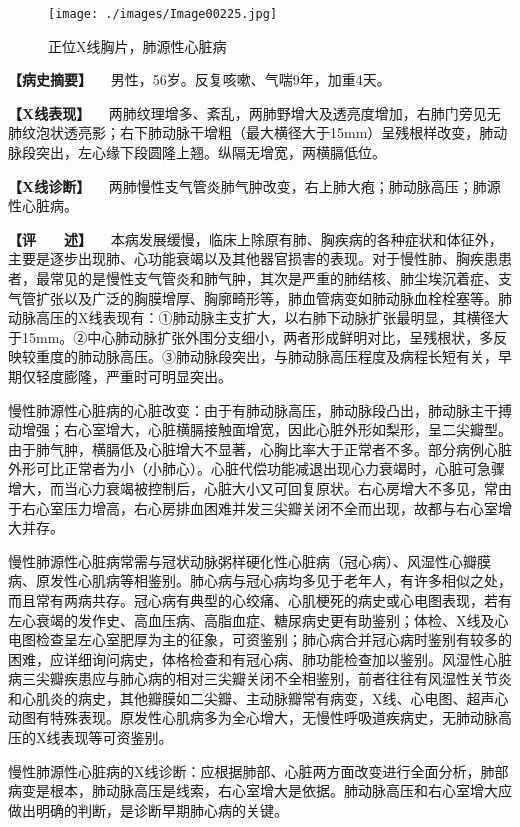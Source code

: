 \begin{figure}[!htbp]
 \centering
 \texttt{[image: ./images/Image00225.jpg]}
 \captionsetup{justification=centering}
 \caption{正位X线胸片，肺源性心脏病}
 \label{fig4-5-1}
  \end{figure} 

\textbf{【病史摘要】} 　男性，56岁。反复咳嗽、气喘9年，加重4天。

\textbf{【X线表现】}
　两肺纹理增多、紊乱，两肺野增大及透亮度增加，右肺门旁见无肺纹泡状透亮影；右下肺动脉干增粗（最大横径大于15mm）呈残根样改变，肺动脉段突出，左心缘下段圆隆上翘。纵隔无增宽，两横膈低位。

\textbf{【X线诊断】}
　两肺慢性支气管炎肺气肿改变，右上肺大疱；肺动脉高压；肺源性心脏病。

\textbf{【评　　述】}
　本病发展缓慢，临床上除原有肺、胸疾病的各种症状和体征外，主要是逐步出现肺、心功能衰竭以及其他器官损害的表现。对于慢性肺、胸疾患患者，最常见的是慢性支气管炎和肺气肿，其次是严重的肺结核、肺尘埃沉着症、支气管扩张以及广泛的胸膜增厚、胸廓畸形等，肺血管病变如肺动脉血栓栓塞等。肺动脉高压的X线表现有：①肺动脉主支扩大，以右肺下动脉扩张最明显，其横径大于15mm。②中心肺动脉扩张外围分支细小，两者形成鲜明对比，呈残根状，多反映较重度的肺动脉高压。③肺动脉段突出，与肺动脉高压程度及病程长短有关，早期仅轻度膨隆，严重时可明显突出。

慢性肺源性心脏病的心脏改变：由于有肺动脉高压，肺动脉段凸出，肺动脉主干搏动增强；右心室增大，心脏横膈接触面增宽，因此心脏外形如梨形，呈二尖瓣型。由于肺气肿，横膈低及心脏增大不显著，心胸比率大于正常者不多。部分病例心脏外形可比正常者为小（小肺心）。心脏代偿功能减退出现心力衰竭时，心脏可急骤增大，而当心力衰竭被控制后，心脏大小又可回复原状。右心房增大不多见，常由于右心室压力增高，右心房排血困难并发三尖瓣关闭不全而出现，故都与右心室增大并存。

慢性肺源性心脏病常需与冠状动脉粥样硬化性心脏病（冠心病）、风湿性心瓣膜病、原发性心肌病等相鉴别。肺心病与冠心病均多见于老年人，有许多相似之处，而且常有两病共存。冠心病有典型的心绞痛、心肌梗死的病史或心电图表现，若有左心衰竭的发作史、高血压病、高脂血症、糖尿病史更有助鉴别；体检、X线及心电图检查呈左心室肥厚为主的征象，可资鉴别；肺心病合并冠心病时鉴别有较多的困难，应详细询问病史，体格检查和有冠心病、肺功能检查加以鉴别。风湿性心脏病三尖瓣疾患应与肺心病的相对三尖瓣关闭不全相鉴别，前者往往有风湿性关节炎和心肌炎的病史，其他瓣膜如二尖瓣、主动脉瓣常有病变，X线、心电图、超声心动图有特殊表现。原发性心肌病多为全心增大，无慢性呼吸道疾病史，无肺动脉高压的X线表现等可资鉴别。

慢性肺源性心脏病的X线诊断：应根据肺部、心脏两方面改变进行全面分析，肺部病变是根本，肺动脉高压是线索，右心室增大是依据。肺动脉高压和右心室增大应做出明确的判断，是诊断早期肺心病的关键。

